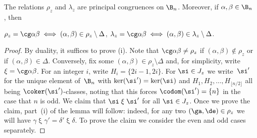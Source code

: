 \begin{proposition}\label{prop:rl_Bn}
The relations $\rho_z$ and $\lambda_z$ are principal congruences on $\B_n$.  Moreover, if $\alpha,\beta\in\B_n$, then
\begin{itemize}\begin{multicols}{2}
 $\rho_z=\cg\alpha\beta\iff (\alpha,\beta)\in\rho_z\setminus\Delta$,
 $\lambda_z=\cg\alpha\beta\iff (\alpha,\beta)\in\lambda_z\setminus\Delta$.
\end{multicols}\end{itemize}
\end{proposition}

\begin{proof}
By duality, it suffices to prove (i).
Note that $\cg\alpha\beta\not=\rho_z$ if $(\alpha,\beta)\not\in\rho_z$ or if $(\alpha,\beta)\in\Delta$.  Conversely, fix some $(\alpha,\beta)\in\rho_z\setminus\Delta$ and, for simplicity, write ${\mathrel\xi}=\cg\alpha\beta$.  For an integer $i$, write $H_i=\{2i-1,2i\}$.  For $\si\in J_z$  we write~$\si'$ for the unique element of~$\B_n$ with $\ker(\si')=\ker(\si)$ and $H_1,H_2,\ldots,H_{\lfloor n/2\rfloor}$ all being $\coker(\si')$-classes, noting that this forces $\codom(\si')=\{n\}$ in the case that $n$ is odd.  We claim that $\si\mathrel\xi\si'$ for all $\si\in J_z$.
%
Once we prove the claim, part~(i) of the lemma will follow:
indeed, for any two $(\ga,\de)\in\rho_z$ we will have $\gamma\mathrel\xi\gamma'=\delta'\mathrel\xi\delta$.
%
To prove the claim we consider the even and odd cases separately.


\end{proof}
